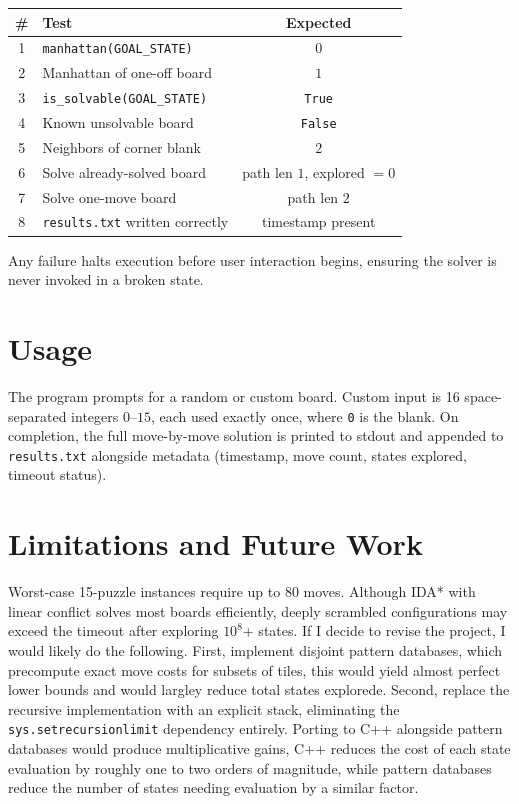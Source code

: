 \documentclass[11pt]{article}
\begin{document}
	\begin{center}
		\begin{tabular}{clc}
			\toprule
			\textbf{\#} & \textbf{Test} & \textbf{Expected} \\
			\midrule
			1 & \texttt{manhattan(GOAL\_STATE)} & $0$ \\
			2 & Manhattan of one-off board & $1$ \\
			3 & \texttt{is\_solvable(GOAL\_STATE)} & \texttt{True} \\
			4 & Known unsolvable board & \texttt{False} \\
			5 & Neighbors of corner blank & $2$ \\
			6 & Solve already-solved board & path len $1$, explored $= 0$ \\
			7 & Solve one-move board & path len $2$ \\
			8 & \texttt{results.txt} written correctly & timestamp present \\
			\bottomrule
		\end{tabular}
	\end{center}
	
	Any failure halts execution before user interaction begins, ensuring the solver 
	is never invoked in a broken state.
	
	\section{Usage}
	
	
	The program prompts for a random or custom board. Custom input is 16 
	space-separated integers $0$--$15$, each used exactly once, where \texttt{0} 
	is the blank. On completion, the full move-by-move solution is printed to 
	stdout and appended to \texttt{results.txt} alongside metadata (timestamp, 
	move count, states explored, timeout status).
	
	\section{Limitations and Future Work}
	
	Worst-case 15-puzzle instances require up to 80 moves. Although IDA* with 
	linear conflict solves most boards efficiently, deeply scrambled configurations 
	may exceed the timeout after exploring $10^8$+ states. If I decide to revise 
	the project, I would likely do the following. First, implement disjoint pattern 
	databases, which precompute exact move costs for subsets of tiles, this would 
	yield almost perfect lower bounds and would largley reduce total states explorede. Second, replace the recursive implementation with an explicit stack, 
	eliminating the \texttt{sys.setrecursionlimit} dependency entirely. Porting to C++ 
	alongside pattern databases would produce multiplicative gains, C++ reduces 
	the cost of each state evaluation by roughly one to two orders of magnitude, 
	while pattern databases reduce the number of states needing evaluation by a 
	similar factor.
	
\end{document}
